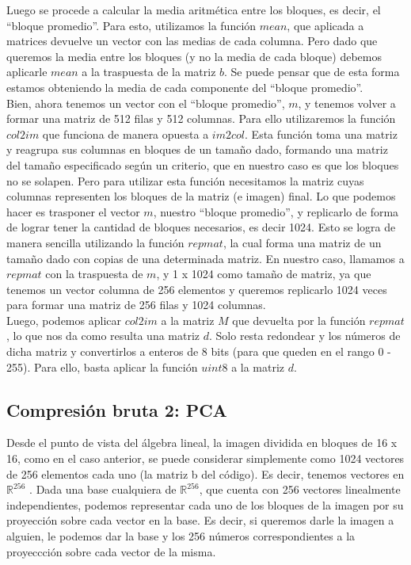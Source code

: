 \documentclass[twocolumn,a4paper,10pt]{article}
\begin{document}
Luego se procede a calcular la media aritm\'etica entre los bloques, es decir, el ``bloque promedio''. Para esto, utilizamos la funci\'on $mean$, que aplicada a 
matrices devuelve un vector con las medias de cada columna. Pero dado que queremos la media entre los bloques (y no la media de cada bloque) debemos aplicarle
$mean$ a la traspuesta de la matriz $b$. Se puede pensar que de esta forma estamos obteniendo la media de cada componente del ``bloque promedio''. \\

Bien, ahora tenemos un vector con el ``bloque promedio'', $m$, y tenemos volver a formar una matriz de 512 filas y 512 columnas. Para ello utilizaremos la funci\'on
$col2im$ que funciona de manera opuesta a $im2col$. Esta funci\'on toma una matriz y reagrupa sus columnas en bloques de un tamaño dado, formando una matriz del 
tamaño especificado seg\'un un criterio, que en nuestro caso es que los bloques no se solapen. Pero para utilizar esta funci\'on necesitamos la matriz cuyas 
columnas representen los bloques de la matriz (e imagen) final. Lo que podemos hacer es trasponer el vector $m$, nuestro ``bloque promedio'', y replicarlo de forma
de lograr tener la cantidad de bloques necesarios, es decir 1024. Esto se logra de manera sencilla utilizando la funci\'on $repmat$, la cual forma una matriz de un
tamaño dado con copias de una determinada matriz. En nuestro caso, llamamos a $repmat$ con la traspuesta de $m$, y 1 x 1024 como tamaño de matriz, ya que tenemos un 
vector columna de 256 elementos y queremos replicarlo 1024 veces para formar una matriz de 256 filas y 1024 columnas.\\

Luego, podemos aplicar $col2im$ a la matriz $M$ que devuelta por la funci\'on $repmat$, lo que nos da como resulta una matriz $d$. Solo resta redondear y los n\'umeros 
de dicha matriz y convertirlos a enteros de 8 bits (para que queden en el rango 0 - 255). Para ello, basta aplicar la funci\'on $uint8$ a la matriz $d$.

\subsection{Compresi\'on bruta 2: PCA}
\label{sec:compresion2}

Desde el punto de vista del  \'algebra lineal, la imagen dividida en bloques de 16 x 16, como en el caso anterior, se puede considerar simplemente como
1024 vectores de 256 elementos cada uno (la matriz b del código). Es decir, tenemos vectores en $\mathbb{R}^{256}$ . Dada una base cualquiera de $\mathbb{R}^{256}$,
 que cuenta con 256 vectores linealmente independientes, podemos representar cada uno de los bloques de la imagen por su proyecci\'on sobre cada vector en la base. 
Es decir, si queremos darle la imagen a alguien, le podemos dar la base y los 256 n\'umeros correspondientes a la proyeccci\'on sobre cada vector de la misma. \\
\end{document}
